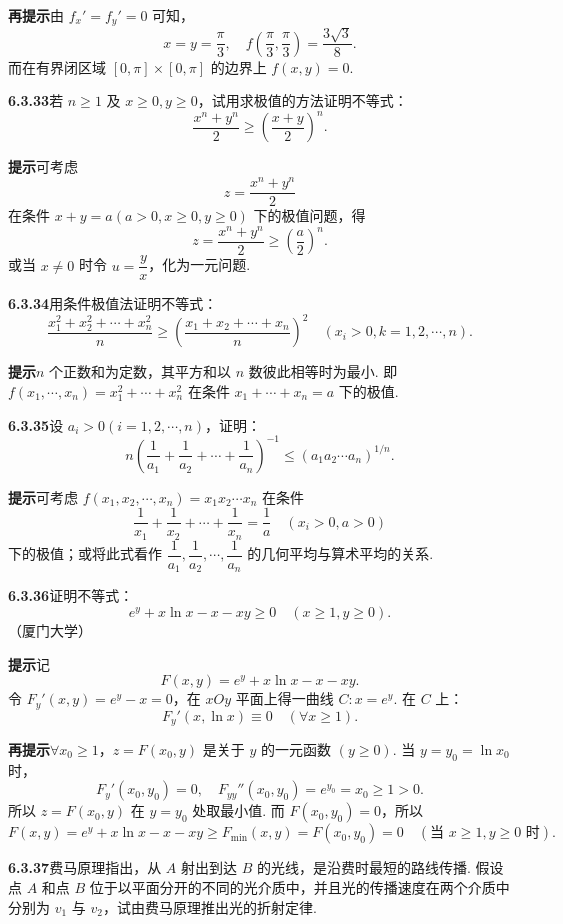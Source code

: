 \documentclass[UTF8,12pt,a4paper,fontset=fandol]{ctexart}
\begin{document}
\noindent\textbf{再提示}\quad 由 $f_x'=f_y'=0$ 可知，
\[
  x=y=\frac\pi3,\quad f\left(\frac\pi3,\frac\pi3\right)=\frac{3\sqrt3}{8}.
\]
而在有界闭区域 $[0,\pi]\times[0,\pi]$ 的边界上 $f(x,y)=0$.

\noindent\textbf{6.3.33}\quad 若 $n\ge1$ 及 $x\ge0,y\ge0$，试用求极值的方法证明不等式：
\[
  \frac{x^n+y^n}{2}\ge\left(\frac{x+y}{2}\right)^n.
\]

\noindent\textbf{提示}\quad 可考虑
\[
  z=\frac{x^n+y^n}{2}
\]
在条件 $x+y=a(a>0,x\ge0,y\ge0)$ 下的极值问题，得
\[
  z=\frac{x^n+y^n}{2}\ge\left(\frac a2\right)^n.
\]
或当 $x\ne0$ 时令 $u=\dfrac yx$，化为一元问题.

\noindent\textbf{6.3.34}\quad 用条件极值法证明不等式：
\[
  \frac{x_1^2+x_2^2+\cdots+x_n^2}{n}
  \ge
  \left(\frac{x_1+x_2+\cdots+x_n}{n}\right)^2
  \quad(x_i>0,k=1,2,\cdots,n).
\]

\noindent\textbf{提示}\quad $n$ 个正数和为定数，其平方和以 $n$ 数彼此相等时为最小. 即 $f(x_1,\cdots,x_n)=x_1^2+\cdots+x_n^2$ 在条件 $x_1+\cdots+x_n=a$ 下的极值.

\noindent\textbf{6.3.35}\quad 设 $a_i>0(i=1,2,\cdots,n)$，证明：
\[
  n\left(\frac1{a_1}+\frac1{a_2}+\cdots+\frac1{a_n}\right)^{-1}
  \le(a_1a_2\cdots a_n)^{1/n}.
\]

\noindent\textbf{提示}\quad 可考虑 $f(x_1,x_2,\cdots,x_n)=x_1x_2\cdots x_n$ 在条件
\[
  \frac1{x_1}+\frac1{x_2}+\cdots+\frac1{x_n}=\frac1a\quad(x_i>0,a>0)
\]
下的极值；或将此式看作 $\dfrac1{a_1},\dfrac1{a_2},\cdots,\dfrac1{a_n}$ 的几何平均与算术平均的关系.

\noindent\textbf{6.3.36}\quad 证明不等式：
\[
  e^y+x\ln x-x-xy\ge0\quad(x\ge1,y\ge0).
\]
（厦门大学）

\noindent\textbf{提示}\quad 记
\[
  F(x,y)=e^y+x\ln x-x-xy.
\]
令 $F_y'(x,y)=e^y-x=0$，在 $xOy$ 平面上得一曲线 $C:x=e^y$. 在 $C$ 上：
\[
  F_y'(x,\ln x)\equiv0\quad(\forall x\ge1).
\]

\noindent\textbf{再提示}\quad $\forall x_0\ge1$，$z=F(x_0,y)$ 是关于 $y$ 的一元函数 $(y\ge0)$. 当 $y=y_0=\ln x_0$ 时，
\[
  F_y'(x_0,y_0)=0,\quad F_{yy}''(x_0,y_0)=e^{y_0}=x_0\ge1>0.
\]
所以 $z=F(x_0,y)$ 在 $y=y_0$ 处取最小值. 而 $F(x_0,y_0)=0$，所以
\[
  F(x,y)=e^y+x\ln x-x-xy\ge F_{\min}(x,y)
  =F(x_0,y_0)=0\quad(\text{当 }x\ge1,y\ge0\text{ 时}).
\]

\noindent\textbf{6.3.37}\quad 费马原理指出，从 $A$ 射出到达 $B$ 的光线，是沿费时最短的路线传播. 假设点 $A$ 和点 $B$ 位于以平面分开的不同的光介质中，并且光的传播速度在两个介质中分别为 $v_1$ 与 $v_2$，试由费马原理推出光的折射定律.
\end{document}

